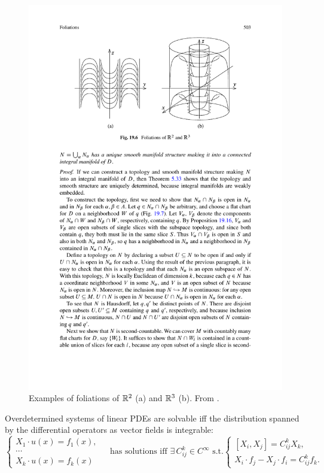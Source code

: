 \begin{figure}
    \centering
    \includegraphics[scale=0.8]{figures/foliations.pdf}
    \caption{Examples of foliations of $\mathbb{R}^2$ (a) and $\mathbb{R}^3$ (b). From \cite{Lee}.}
    \label{fig:foliations}
\end{figure}

\begin{example}
    Overdetermined systems of linear PDEs are solvable iff the distribution spanned by the differential operators as vector fields is integrable:
    \[\begin{cases}
        X_1\cdot u(x)=f_1(x),&\\
        \cdots &\\
        X_k\cdot u(x)=f_k(x)&
    \end{cases}
    \text{ has solutions iff }\exists\,C^k_{ij}\in C^\infty\text{ s.t.}
    \begin{cases}
        [X_i,X_j]=C^k_{ij}X_k,&\\
        X_i\cdot f_j-X_j\cdot f_i=C^k_{ij}f_k.&
    \end{cases}
    \]
\end{example}

